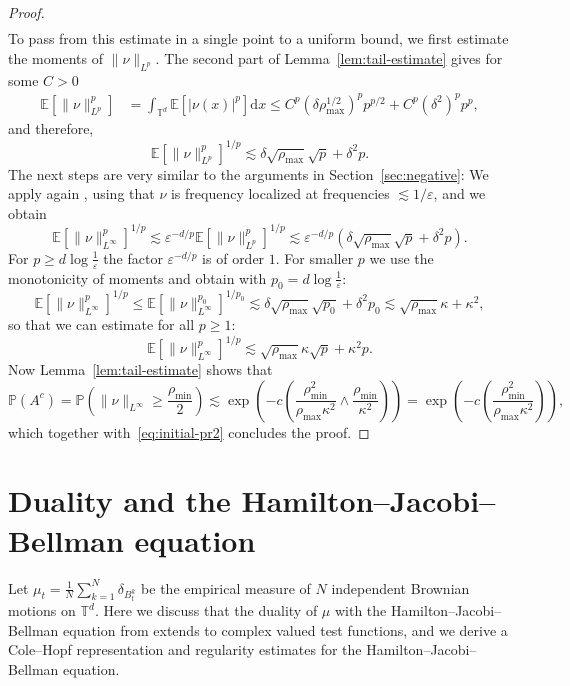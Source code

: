 \documentclass[a4paper,12pt]{article}
\newcommand{\mathd}{\mathrm{d}}
\begin{document}
\begin{proof}
\begin{align*}
\end{align*}
To pass from this estimate in a single point to a uniform bound, we first estimate the moments of $\|\nu\|_{L^p}$. The second part of Lemma~\ref{lem:tail-estimate} gives for some $C>0$
\begin{align*}
    \mathbb E[\|\nu\|_{L^p}^p] & = \int_{\mathbb T^d} \mathbb E[|\nu(x)|^p]\mathd x \leq C^p (\delta \rho_{\max}^{1/2})^{p} p^{p/2} + C^p (\delta^2)^p p^p,  
\end{align*}
and therefore,
\[
    \mathbb E[\|\nu\|_{L^p}^p]^{1/p} \lesssim \delta \sqrt{\rho_{\max}} \sqrt{p} + \delta^2 p.
\]
The next steps are very similar to the arguments in Section~\ref{sec:negative}: We apply again \cite[Lemma 2.1]{Bahouri2011}, using that $\nu$ is frequency localized at frequencies $\lesssim 1/\varepsilon$, and we obtain
\[
    \mathbb E[\|\nu\|_{L^\infty}^p]^{1/p} \lesssim \varepsilon^{-d/p} \mathbb E[\|\nu\|_{L^p}^p]^{1/p} \lesssim \varepsilon^{-d/p}\left(\delta\sqrt{\rho_{\max}}  \sqrt{p} + \delta^2 p\right).
\]
For $p\geq d \log \tfrac1\varepsilon$ the factor $\varepsilon^{-d/p}$ is of order $1$. For smaller $p$ we use the monotonicity of moments and obtain with $p_0 = d \log \tfrac1\varepsilon$:
\[
    \mathbb E[\|\nu\|_{L^\infty}^p]^{1/p} \leq \mathbb E[\|\nu\|_{L^\infty}^{p_0}]^{1/p_0} \lesssim \delta \sqrt{\rho_{\max}}  \sqrt{p_0} + \delta^2 p_0 \lesssim \sqrt{\rho_{\max}}\kappa + \kappa^2,
\]
so that we can estimate for all $p \geq 1$:
\[
    \mathbb E[\|\nu\|_{L^\infty}^p]^{1/p} \lesssim \sqrt{\rho_{\max}} \kappa \sqrt{p} + \kappa^2 p.
\]
Now Lemma~\ref{lem:tail-estimate} shows that
\[
    \mathbb P(A^c) = \mathbb P\left(\|\nu\|_{L^\infty} \geq \frac{\rho_{\min}}{2}\right) \lesssim \exp\left(-c \left(\frac{\rho_{\min}^2}{\rho_{\max}\kappa^2}\wedge \frac{\rho_{\min}}{\kappa^2}\right)\right) = \exp\left(-c \left(\frac{\rho_{\min}^2}{\rho_{\max}\kappa^2}\right)\right),
\]
which together with~\eqref{eq:initial-pr2} concludes the proof.
\end{proof}

\section{Duality and the Hamilton--Jacobi--Bellman equation}\label{sec:HJB}

Let $\mu_t = \tfrac1N \sum_{k=1}^N \delta_{B^k_t}$ be the empirical measure of $N$ independent Brownian motions on $\mathbb T^d$. Here we discuss that the duality of $\mu$ with the Hamilton--Jacobi--Bellman equation from \cite{Konarovskyi2019} extends to complex valued test functions, and we derive a Cole--Hopf representation and regularity estimates for the Hamilton--Jacobi--Bellman equation. 
\end{document}
